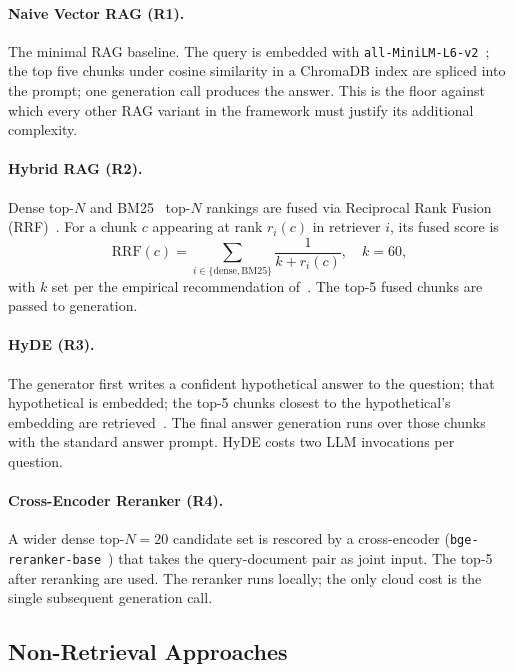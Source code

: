 \documentclass[conference,a4paper,10pt]{IEEEtran}
\begin{document}
\paragraph{Naive Vector RAG (R1).}
The minimal RAG baseline.
The query is embedded with \texttt{all-MiniLM-L6-v2}~\cite{reimers2019sbert}; the top five chunks under cosine similarity in a ChromaDB index are spliced into the prompt; one generation call produces the answer.
This is the floor against which every other RAG variant in the framework must justify its additional complexity.

\paragraph{Hybrid RAG (R2).}
Dense top-$N$ and BM25~\cite{robertson2009bm25} top-$N$ rankings are fused via Reciprocal Rank Fusion (RRF)~\cite{cormack2009rrf}.
For a chunk $c$ appearing at rank $r_i(c)$ in retriever $i$, its fused score is
\begin{equation}
\mathrm{RRF}(c) = \sum_{i \in \{\mathrm{dense},\mathrm{BM25}\}} \frac{1}{k + r_i(c)}, \quad k = 60,
\label{eq:rrf}
\end{equation}
with $k$ set per the empirical recommendation of~\cite{cormack2009rrf}.
The top-5 fused chunks are passed to generation.

\paragraph{HyDE (R3).}
The generator first writes a confident hypothetical answer to the question; that hypothetical is embedded; the top-5 chunks closest to the hypothetical's embedding are retrieved~\cite{gao2023hyde}.
The final answer generation runs over those chunks with the standard answer prompt.
HyDE costs two LLM invocations per question.

\paragraph{Cross-Encoder Reranker (R4).}
A wider dense top-$N=20$ candidate set is rescored by a cross-encoder (\texttt{bge-reranker-base}~\cite{xiao2023cpack}) that takes the query-document pair as joint input.
The top-5 after reranking are used.
The reranker runs locally; the only cloud cost is the single subsequent generation call.

\subsection{Non-Retrieval Approaches}
\label{sec:nonrag-methods}
\end{document}
